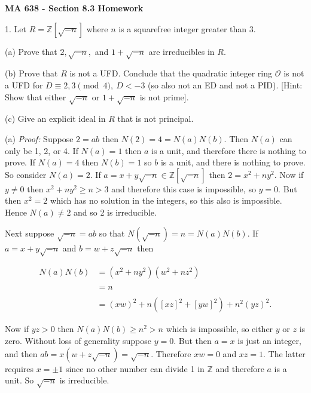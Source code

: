\documentclass[11pt]{article}
\def\noin{\noindent}
\begin{document}
\thispagestyle{empty}
%
%


\large
\noin \textbf{MA 638 - Section 8.3 Homework}\\


\normalsize

1. Let $R=\mathbb Z[\sqrt{-n}]$ where $n$ is a squarefree integer greater than 3.

(a)  Prove that $2,\sqrt{-n},$ and $1 +\sqrt{-n}$ are irreducibles in $R$.

(b)  Prove that $R$ is not a UFD. Conclude that the quadratic integer ring $\mathcal O$ is not a UFD for $D\equiv 2, 3 \pmod{ 4}, \ D <-3$ (so also not an ED and not a PID). [Hint:  Show that either $\sqrt{-n}$ or $1 +\sqrt{-n}$ is not prime].

(c)  Give an explicit ideal in $R$ that is not principal.

(a) {\it Proof:}  Suppose $2=ab$ then $N(2) = 4 = N(a)N(b)$.  Then $N(a)$ can only be 1, 2, or 4.  If $N(a)=1$ then $a$ is a unit, and therefore there is nothing to prove.  If $N(a)=4$ then $N(b)=1$ so $b$ is a unit, and there is nothing to prove.  So consider $N(a)=2$.  If $a=x+y\sqrt{-n}\in \mathbb Z[\sqrt{-n}]$ then $2=x^2+ny^2$.  Now if $y\ne 0$ then $x^2+ny^2 \geq n > 3$ and therefore this case is impossible, so $y=0$. But then $x^2 = 2$ which has no solution in the integers, so this also is impossible.  Hence $N(a)\ne 2$ and so 2 is irreducible.

Next suppose $\sqrt{-n}=ab$ so that $N(\sqrt{-n})=n=N(a)N(b)$.  If $a=x+y\sqrt{-n}$ and $b=w+z\sqrt{-n}$ then 

\begin{align*}
    N(a)N(b)&=(x^2+ny^2)(w^2+nz^2) \\\\
    &=n\\\\
    &= (xw)^2+n( [xz]^2+[yw]^2) + n^2(yz)^2.
\end{align*}

Now if $yz>0$ then $N(a)N(b) \geq n^2 > n$ which is impossible, so either $y$ or $z$ is zero.  Without loss of generality suppose $y=0$.  But then $a=x$ is just an integer, and then $ab=x(w+z\sqrt{-n})=\sqrt{-n}$.  Therefore $xw = 0$ and $xz = 1$.  The latter requires $x=\pm 1$ since no other number can divide 1 in $\mathbb Z$ and therefore $a$ is a unit.  So $\sqrt{-n}$ is irreducible.  
\end{document}

